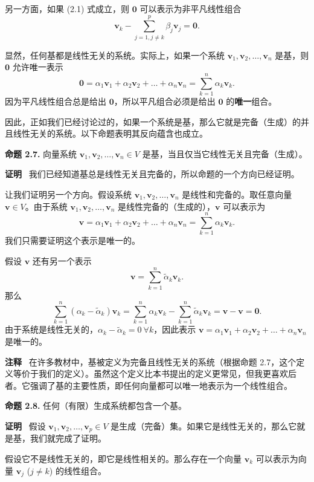 另一方面，如果 (2.1) 式成立，则 $\mathbf{0}$ 可以表示为非平凡线性组合 
$$\mathbf{v}_k - \sum_{j=1, j \neq k}^p \beta_j \mathbf{v}_j = \mathbf{0}.$$


显然，任何基都是线性无关的系统。实际上，如果一个系统 $\mathbf{v}_1, \mathbf{v}_2, \dots, \mathbf{v}_n$ 是基，则 $\mathbf{0}$ 允许唯一表示 
$$\mathbf{0} = \alpha_1 \mathbf{v}_1 + \alpha_2 \mathbf{v}_2 + \dots + \alpha_n \mathbf{v}_n = \sum_{k=1}^n \alpha_k \mathbf{v}_k.$$
因为平凡线性组合总是给出 $\mathbf{0}$，所以平凡组合必须是给出 $\mathbf{0}$ 的\textbf{唯一}组合。

因此，正如我们已经讨论过的，如果一个系统是基，那么它就是完备（生成）的并且线性无关的系统。以下命题表明其反向蕴含也成立。

\textbf{命题 2.7.} 向量系统 $\mathbf{v}_1, \mathbf{v}_2, \dots, \mathbf{v}_n \in V$ 是基，当且仅当它线性无关且完备（生成）。

\textbf{证明}~ 
我们已经知道基总是线性无关且完备的，所以命题的一个方向已经证明。

让我们证明另一个方向。假设系统 $\mathbf{v}_1, \mathbf{v}_2, \dots, \mathbf{v}_n$ 是线性和完备的。取任意向量 $\mathbf{v} \in V$。由于系统 $\mathbf{v}_1, \mathbf{v}_2, \dots, \mathbf{v}_n$ 是线性完备的（生成的），$\mathbf{v}$ 可以表示为 
$$\mathbf{v} = \alpha_1 \mathbf{v}_1 + \alpha_2 \mathbf{v}_2 + \dots + \alpha_n \mathbf{v}_n = \sum_{k=1}^n \alpha_k \mathbf{v}_k.$$
我们只需要证明这个表示是唯一的。

假设 $\mathbf{v}$ 还有另一个表示 $$\mathbf{v} = \sum_{k=1}^n \tilde{\alpha}_k \mathbf{v}_k.$$
那么 
$$\sum_{k=1}^n (\alpha_k - \tilde{\alpha}_k) \mathbf{v}_k = \sum_{k=1}^n \alpha_k \mathbf{v}_k - \sum_{k=1}^n \tilde{\alpha}_k \mathbf{v}_k = \mathbf{v} - \mathbf{v} = \mathbf{0}.$$
由于系统是线性无关的，$\alpha_k - \tilde{\alpha}_k = 0 \ \forall k$，因此表示 $\mathbf{v} = \alpha_1 \mathbf{v}_1 + \alpha_2 \mathbf{v}_2 + \dots + \alpha_n \mathbf{v}_n$ 是唯一的。

\textbf{注释}~ 在许多教材中，基被定义为完备且线性无关的系统（根据命题 2.7，这个定义等价于我们的定义）。虽然这个定义比本书提出的定义更常见，但我更喜欢后者。它强调了基的主要性质，即任何向量都可以唯一地表示为一个线性组合。

\textbf{命题 2.8.} 任何（有限）生成系统都包含一个基。

\textbf{证明}~ 
假设 $\mathbf{v}_1, \mathbf{v}_2, \dots, \mathbf{v}_p \in V$ 是生成（完备）集。如果它是线性无关的，那么它就是基，我们就完成了证明。

假设它不是线性无关的，即它是线性相关的。那么存在一个向量 $\mathbf{v}_k$ 可以表示为向量 $\mathbf{v}_j$ ($j \neq k$) 的线性组合。

